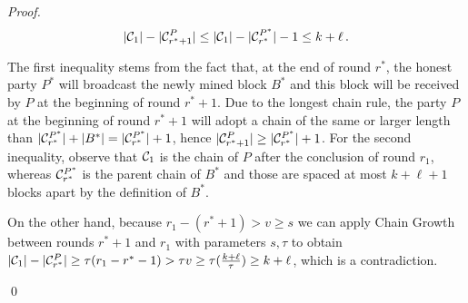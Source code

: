 \begin{proof}
  \[
     |\mathcal{C}_1| - |\mathcal{C}^P_{r^* + 1}| \leq
     |\mathcal{C}_1| - |\mathcal{C}^{P^*}_{r^*}| - 1 \leq
     k + \ell\,.
  \]

  The first inequality stems from the fact that, at the end of round
  $r^*$, the honest party $P^*$ will broadcast the newly mined block $B^*$
  and this block will be received by $P$ at the beginning of round $r^* + 1$.
  Due to the longest chain rule, the party $P$ at the beginning of round $r^* + 1$ will
  adopt a chain of the same or larger length than
  $|\mathcal{C}^{P^*}_{r^*}| + |B^*| = |\mathcal{C}^{P^*}_{r^*}| + 1$,
  hence
  $|\mathcal{C}^P_{r^* + 1}| \geq |\mathcal{C}^{P^*}_{r^*}| + 1$.
  For the second inequality, observe that
  $\mathcal{C}_1$ is the chain of $P$ after the conclusion
  of round $r_1$, whereas $\mathcal{C}^{P^*}_{r^*}$ is
  the parent chain of $B^*$ and those are spaced at most $k + \ell + 1$ blocks apart by the definition
  of $B^*$.

  On the other hand, because $r_1 - (r^* + 1) > v \geq s$ we can apply Chain Growth
  between rounds $r^* + 1$ and $r_1$
  with parameters
  $s, \tau$ to obtain
  $|\mathcal{C}_1| - |\mathcal{C}^P_{r^*}| \geq \tau(r_1 - r^* - 1) > \tau v \geq
  \tau (\frac{k + \ell}{\tau}) \geq k + \ell$,
  which is a contradiction.

  \qed
\end{proof}